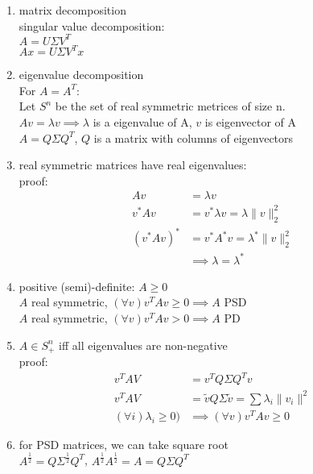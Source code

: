 \documentclass[12pt,letter]{article}
\begin{document}

\begin{enumerate}
\item matrix decomposition\\
  singular value decomposition:\\
  $A=U\Sigma V^T$\\
  $Ax=U\Sigma V^Tx$
\item eigenvalue decomposition\\
  For $A=A^T$:\\
  Let $S^n$ be the set of real symmetric metrices of size n.\\
  $Av=\lambda v \implies \lambda$ is a eigenvalue of A, $v$ is eigenvector of A\\
  $A=Q\Sigma Q^T$, $Q$ is a matrix with columns of eigenvectors\\
\item real symmetric matrices have real eigenvalues:\\
  proof:
  \begin{align*}
    Av&=\lambda v\\ 
    v^*Av&=v^*\lambda v=\lambda \|v\|_2^2\\
    (v^* A v)^*&= v^* A^* v = \lambda^* \|v\|_2^2\\
      &\implies \lambda = \lambda^*
    \end{align*}
\item positive (semi)-definite: $A\geq 0$\\
  $A$ real symmetric, $(\forall v) v^TAv \geq 0 \implies A$  PSD\\
  $A$ real symmetric, $(\forall v) v^TAv > 0 \implies A$ PD\\
\item $A \in S_+^n$ iff all eigenvalues are non-negative\\
  proof:\\
  \begin{align*}
    v^T A V &= v^T Q \Sigma Q^T v\\
    v^T A V &= \tilde{v} Q \Sigma \tilde{v}=\sum \lambda_i \|v_i\|^2\\
    (\forall i) \lambda_i \geq 0) & \implies (\forall v)v^T A v \geq 0
  \end{align*}
\item for PSD matrices, we can take square root\\
  $A^{\frac{1}{2}}=Q\Sigma^{\frac{1}{2}} Q^T$, $A^{\frac{1}{2}}A^{\frac{1}{2}}=A=Q\Sigma Q^T$\\


\end{enumerate}
\end{document}
